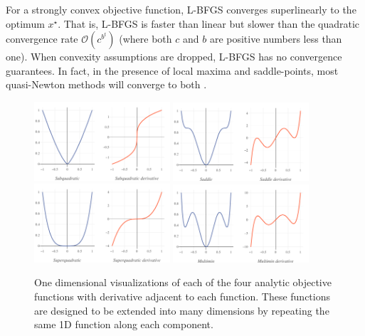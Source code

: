 \documentclass[letterpaper, 10 pt, conference]{IEEEtran}  %
\begin{document}
For a strongly convex objective function, L-BFGS converges
superlinearly to the optimum $x^\star$.  That is, L-BFGS is faster
than linear but slower than the quadratic convergence rate
$\mathcal{O}\left( c^{b^t} \right)$ (where both $c$ and $b$ are
positive numbers less than one).  When convexity assumptions are
dropped, L-BFGS has no convergence guarantees.  In fact, in the
presence of local maxima and saddle-points, most quasi-Newton methods
will converge to both \cite{dauphin2014identifying}.

\begin{figure}
  \centering
  \includegraphics[width=0.45\textwidth]{Figures/final-subquadratic}
  \hspace{5mm}
  \includegraphics[width=0.45\textwidth]{Figures/final-saddle}
  \\\vspace{5mm}
  \includegraphics[width=0.45\textwidth]{Figures/final-superquadratic}
  \hspace{5mm}
  \includegraphics[width=0.45\textwidth]{Figures/final-multimin}
  \caption{One dimensional visualizations of each of the four analytic
    objective functions with derivative adjacent to each
    function. These functions are designed to be extended into many
    dimensions by repeating the same 1D function along each
    component.}
  \label{fig:objectives}
\end{figure}
\end{document}

